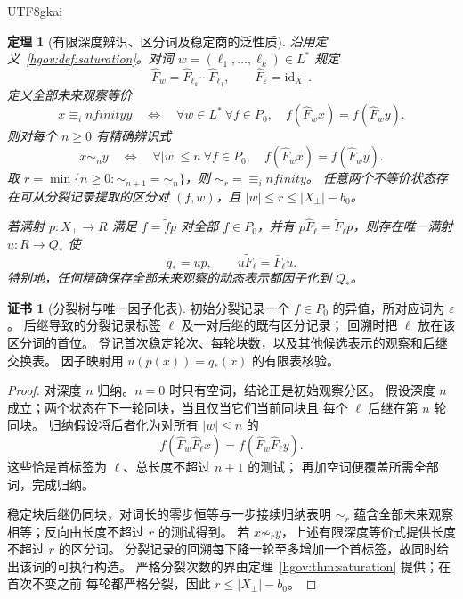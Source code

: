 \documentclass[12pt,a4paper,openany,notitlepage]{report}
\theoremstyle{plain}
\newtheorem{theorem}{定理}[chapter]
\theoremstyle{definition}
\newtheorem*{certificate}{证书}
\theoremstyle{remark}
\def\mathcal#1{#1}\def\mathsf#1{#1}\def\mathbb#1{#1}%
\def\infty{infinity}\def\Gamma{Gamma}\def\Phi{Phi}%
\begin{document}
\begin{CJK*}{UTF8}{gkai}
\begin{theorem}[有限深度辨识、区分词及稳定商的泛性质]
\label{exp:gov:future-equivalence}
沿用定义~\ref{hgov:def:saturation}。对词
$w=(\ell_1,\ldots,\ell_k)\in L^*$ 规定
\[
 \widehat F_w=\widehat F_{\ell_k}\cdots\widehat F_{\ell_1},
 \qquad \widehat F_{\varepsilon}=\mathrm{id}_{X_\bot}.
\]
定义全部未来观察等价
\[
 x\equiv_\infty y
 \quad\Longleftrightarrow\quad
 \forall w\in L^*\ \forall f\in\mathcal P_0,
 \quad f(\widehat F_wx)=f(\widehat F_wy).
\]
则对每个 $n\ge0$ 有精确辨识式
\[
 x\sim_ny
 \quad\Longleftrightarrow\quad
 \forall |w|\le n\ \forall f\in\mathcal P_0,
 \quad f(\widehat F_wx)=f(\widehat F_wy).
\]
取 $r=\min\{n\ge0:\sim_{n+1}=\sim_n\}$，则 $\sim_r=\equiv_\infty$。
任意两个不等价状态存在可从分裂记录提取的区分对 $(f,w)$，且
$|w|\le r\le |X_\bot|-b_0$。

若满射 $p:X_\bot\to R$ 满足
$f=\widetilde f p$ 对全部 $f\in\mathcal P_0$，并有
$p\widehat F_\ell=\widetilde F_\ell p$，则存在唯一满射
$u:R\to Q_*$ 使
\[
 q_*=up,\qquad
 u\widetilde F_\ell=\bar F_\ell u.
\]
特别地，任何精确保存全部未来观察的动态表示都因子化到 $Q_*$。
\end{theorem}
\begin{certificate}[分裂树与唯一因子化表]
初始分裂记录一个 $f\in\mathcal P_0$ 的异值，所对应词为 $\varepsilon$。
后继导致的分裂记录标签 $\ell$ 及一对后继的既有区分记录；
回溯时把 $\ell$ 放在该区分词的首位。
登记首次稳定轮次、每轮块数，以及其他候选表示的观察和后继交换表。
因子映射用 $u(p(x))=q_*(x)$ 的有限表核验。
\end{certificate}
\begin{proof}
对深度 $n$ 归纳。$n=0$ 时只有空词，结论正是初始观察分区。
假设深度 $n$ 成立；两个状态在下一轮同块，当且仅当它们当前同块且
每个 $\ell$ 后继在第 $n$ 轮同块。
归纳假设将后者化为对所有 $|w|\le n$ 的
\[
 f(\widehat F_w\widehat F_\ell x)
 =f(\widehat F_w\widehat F_\ell y).
\]
这些恰是首标签为 $\ell$、总长度不超过 $n+1$ 的测试；
再加空词便覆盖所需全部词，完成归纳。

稳定块后继仍同块，对词长的零步恒等与一步接续归纳表明
$\sim_r$ 蕴含全部未来观察相等；反向由长度不超过 $r$ 的测试得到。
若 $x\not\sim_ry$，上述有限深度等价式提供长度不超过 $r$ 的区分词。
分裂记录的回溯每下降一轮至多增加一个首标签，故同时给出该词的可执行构造。
严格分裂次数的界由定理~\ref{hgov:thm:saturation} 提供；在首次不变之前
每轮都严格分裂，因此 $r\le |X_\bot|-b_0$。


\end{proof}
\end{CJK*}
\end{document}
